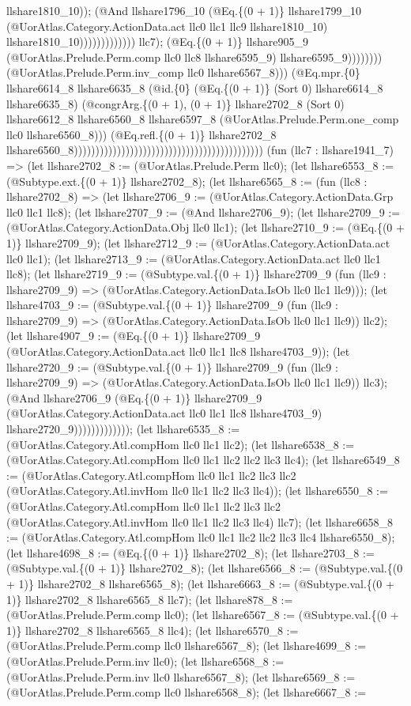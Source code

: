 \documentclass[11pt]{article}
\begin{document}
llshare1810\_10)); (@And llshare1796\_10 (@Eq.\{(0 + 1)\} llshare1799\_10 (@UorAtlas.Category.ActionData.act llc0 llc1 llc9 llshare1810\_10) llshare1810\_10))))))))))))) llc7); (@Eq.\{(0 + 1)\} llshare905\_9 (@UorAtlas.Prelude.Perm.comp llc0 llc8 llshare6595\_9) llshare6595\_9)))))))) (@UorAtlas.Prelude.Perm.inv\_comp llc0 llshare6567\_8))) (@Eq.mpr.\{0\} llshare6614\_8 llshare6635\_8 (@id.\{0\} (@Eq.\{(0 + 1)\} (Sort 0) llshare6614\_8 llshare6635\_8) (@congrArg.\{(0 + 1), (0 + 1)\} llshare2702\_8 (Sort 0) llshare6612\_8 llshare6560\_8 llshare6597\_8 (@UorAtlas.Prelude.Perm.one\_comp llc0 llshare6560\_8))) (@Eq.refl.\{(0 + 1)\} llshare2702\_8 llshare6560\_8)))))))))))))))))))))))))))))))))))))))))))) (fun (llc7 : llshare1941\_7) => (let llshare2702\_8 := (@UorAtlas.Prelude.Perm llc0); (let llshare6553\_8 := (@Subtype.ext.\{(0 + 1)\} llshare2702\_8); (let llshare6565\_8 := (fun (llc8 : llshare2702\_8) => (let llshare2706\_9 := (@UorAtlas.Category.ActionData.Grp llc0 llc1 llc8); (let llshare2707\_9 := (@And llshare2706\_9); (let llshare2709\_9 := (@UorAtlas.Category.ActionData.Obj llc0 llc1); (let llshare2710\_9 := (@Eq.\{(0 + 1)\} llshare2709\_9); (let llshare2712\_9 := (@UorAtlas.Category.ActionData.act llc0 llc1); (let llshare2713\_9 := (@UorAtlas.Category.ActionData.act llc0 llc1 llc8); (let llshare2719\_9 := (@Subtype.val.\{(0 + 1)\} llshare2709\_9 (fun (llc9 : llshare2709\_9) => (@UorAtlas.Category.ActionData.IsOb llc0 llc1 llc9))); (let llshare4703\_9 := (@Subtype.val.\{(0 + 1)\} llshare2709\_9 (fun (llc9 : llshare2709\_9) => (@UorAtlas.Category.ActionData.IsOb llc0 llc1 llc9)) llc2); (let llshare4907\_9 := (@Eq.\{(0 + 1)\} llshare2709\_9 (@UorAtlas.Category.ActionData.act llc0 llc1 llc8 llshare4703\_9)); (let llshare2720\_9 := (@Subtype.val.\{(0 + 1)\} llshare2709\_9 (fun (llc9 : llshare2709\_9) => (@UorAtlas.Category.ActionData.IsOb llc0 llc1 llc9)) llc3); (@And llshare2706\_9 (@Eq.\{(0 + 1)\} llshare2709\_9 (@UorAtlas.Category.ActionData.act llc0 llc1 llc8 llshare4703\_9) llshare2720\_9))))))))))))); (let llshare6535\_8 := (@UorAtlas.Category.Atl.compHom llc0 llc1 llc2); (let llshare6538\_8 := (@UorAtlas.Category.Atl.compHom llc0 llc1 llc2 llc2 llc3 llc4); (let llshare6549\_8 := (@UorAtlas.Category.Atl.compHom llc0 llc1 llc2 llc3 llc2 (@UorAtlas.Category.Atl.invHom llc0 llc1 llc2 llc3 llc4)); (let llshare6550\_8 := (@UorAtlas.Category.Atl.compHom llc0 llc1 llc2 llc3 llc2 (@UorAtlas.Category.Atl.invHom llc0 llc1 llc2 llc3 llc4) llc7); (let llshare6658\_8 := (@UorAtlas.Category.Atl.compHom llc0 llc1 llc2 llc2 llc3 llc4 llshare6550\_8); (let llshare4698\_8 := (@Eq.\{(0 + 1)\} llshare2702\_8); (let llshare2703\_8 := (@Subtype.val.\{(0 + 1)\} llshare2702\_8); (let llshare6566\_8 := (@Subtype.val.\{(0 + 1)\} llshare2702\_8 llshare6565\_8); (let llshare6663\_8 := (@Subtype.val.\{(0 + 1)\} llshare2702\_8 llshare6565\_8 llc7); (let llshare878\_8 := (@UorAtlas.Prelude.Perm.comp llc0); (let llshare6567\_8 := (@Subtype.val.\{(0 + 1)\} llshare2702\_8 llshare6565\_8 llc4); (let llshare6570\_8 := (@UorAtlas.Prelude.Perm.comp llc0 llshare6567\_8); (let llshare4699\_8 := (@UorAtlas.Prelude.Perm.inv llc0); (let llshare6568\_8 := (@UorAtlas.Prelude.Perm.inv llc0 llshare6567\_8); (let llshare6569\_8 := (@UorAtlas.Prelude.Perm.comp llc0 llshare6568\_8); (let llshare6667\_8 := 
\end{document}
